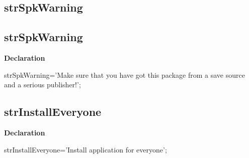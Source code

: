 \documentclass{report}
\newif\ifpdf
\begin{document}
\subsection*{\large{\textbf{strSpkWarning}}\normalsize\hspace{1ex}\hrulefill}
\else
\subsection*{strSpkWarning}
\fi
\label{trstrings-strSpkWarning}
\begin{list}{}{
\setlength{\itemindent}{0cm}
\setlength{\listparindent}{0cm}
\setlength{\leftmargin}{\evensidemargin}
\addtolength{\leftmargin}{\tmplength}
\settowidth{\labelsep}{X}
\addtolength{\leftmargin}{\labelsep}
\setlength{\labelwidth}{\tmplength}
}
\item[\textbf{Declaration}\hfill]
\ifpdf
\begin{flushleft}
\fi
\begin{ttfamily}
strSpkWarning='Make sure that you have got this package from a save source and a serious publisher!';\end{ttfamily}

\ifpdf
\end{flushleft}
\fi

\end{list}
\ifpdf
\subsection*{\large{\textbf{strInstallEveryone}}\normalsize\hspace{1ex}\hrulefill}
\else
\subsection*{strInstallEveryone}
\fi
\label{trstrings-strInstallEveryone}
\begin{list}{}{
\setlength{\itemindent}{0cm}
\setlength{\listparindent}{0cm}
\setlength{\leftmargin}{\evensidemargin}
\addtolength{\leftmargin}{\tmplength}
\settowidth{\labelsep}{X}
\addtolength{\leftmargin}{\labelsep}
\setlength{\labelwidth}{\tmplength}
}
\item[\textbf{Declaration}\hfill]
\ifpdf
\begin{flushleft}
\fi
\begin{ttfamily}
strInstallEveryone='Install application for everyone';\end{ttfamily}

\ifpdf
\end{flushleft}
\fi

\end{list}
\ifpdf
\end{document}
